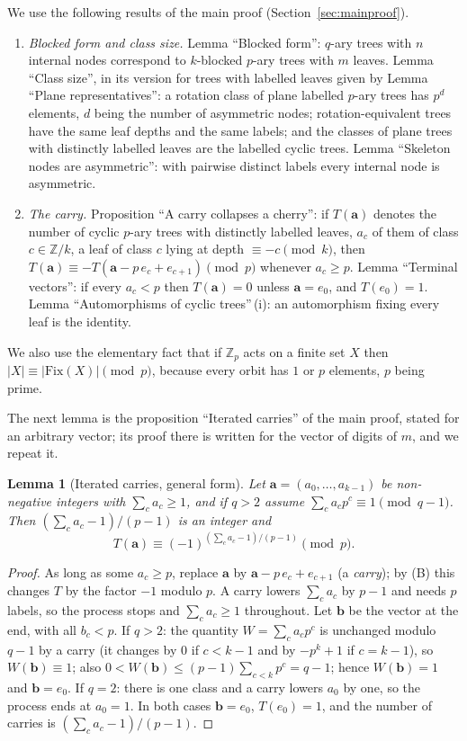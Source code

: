\documentclass[11pt]{article}
\newtheorem{lemma}[theorem]{Lemma}
\theoremstyle{definition}
\theoremstyle{remark}
\numberwithin{equation}{section}
\numberwithin{figure}{section}
\newcommand{\Z}{\mathbb Z}
\begin{document}
We use the following results of the main proof (Section~\ref{sec:mainproof}).
\begin{enumerate}[label=(\Alph*)]
\item \emph{Blocked form and class size.} Lemma ``Blocked form'': $q$-ary trees with $n$
      internal nodes correspond to $k$-blocked $p$-ary trees with $m$ leaves. Lemma ``Class
      size'', in its version for trees with labelled leaves given by Lemma ``Plane
      representatives'': a rotation class of plane labelled $p$-ary trees has $p^{d}$ elements,
      $d$ being the number of asymmetric nodes; rotation-equivalent trees have the same leaf
      depths and the same labels; and the classes of plane trees with distinctly labelled
      leaves are the labelled cyclic trees. Lemma ``Skeleton nodes are asymmetric'': with
      pairwise distinct labels every internal node is asymmetric.
\item \emph{The carry.} Proposition ``A carry collapses a cherry'': if $T(\mathbf a)$ denotes
      the number of cyclic $p$-ary trees with distinctly labelled leaves, $a_c$ of them of
      class $c\in\Z/k$, a leaf of class $c$ lying at depth $\equiv-c\pmod k$, then
      $T(\mathbf a)\equiv-T(\mathbf a-p\,e_c+e_{c+1})\pmod p$ whenever $a_c\ge p$. Lemma
      ``Terminal vectors'': if every $a_c<p$ then $T(\mathbf a)=0$ unless $\mathbf a=e_0$, and
      $T(e_0)=1$. Lemma ``Automorphisms of cyclic trees''\,(i): an automorphism fixing every
      leaf is the identity.
\end{enumerate}
We also use the elementary fact that if $\Z_p$ acts on a finite set $X$ then
$|X|\equiv|\mathrm{Fix}(X)|\pmod p$, because every orbit has $1$ or $p$ elements, $p$ being
prime.

The next lemma is the proposition ``Iterated carries'' of the main proof, stated for an
arbitrary vector; its proof there is written for the vector of digits of $m$, and we repeat it.

\begin{lemma}[Iterated carries, general form]\label{acc:L0}
Let $\mathbf a=(a_0,\dots,a_{k-1})$ be non-negative integers with $\sum_ca_c\ge1$, and if
$q>2$ assume $\sum_ca_cp^c\equiv1\pmod{q-1}$. Then $(\sum_ca_c-1)/(p-1)$ is an integer and
\[
 T(\mathbf a)\equiv(-1)^{(\sum_ca_c-1)/(p-1)}\pmod p .
\]
\end{lemma}
\begin{proof}
As long as some $a_c\ge p$, replace $\mathbf a$ by $\mathbf a-p\,e_c+e_{c+1}$ (a \emph{carry});
by (B) this changes $T$ by the factor $-1$ modulo $p$. A carry lowers $\sum_ca_c$ by $p-1$ and
needs $p$ labels, so the process stops and $\sum_ca_c\ge1$ throughout. Let $\mathbf b$ be the
vector at the end, with all $b_c<p$.
If $q>2$: the quantity $W=\sum_ca_cp^c$ is unchanged modulo $q-1$ by a carry (it changes by $0$
if $c<k-1$ and by $-p^k+1$ if $c=k-1$), so $W(\mathbf b)\equiv1$; also
$0<W(\mathbf b)\le(p-1)\sum_{c<k}p^c=q-1$; hence $W(\mathbf b)=1$ and $\mathbf b=e_0$.
If $q=2$: there is one class and a carry lowers $a_0$ by one, so the process ends at $a_0=1$.
In both cases $\mathbf b=e_0$, $T(e_0)=1$, and the number of carries is
$(\sum_ca_c-1)/(p-1)$.
\end{proof}
\end{document}
